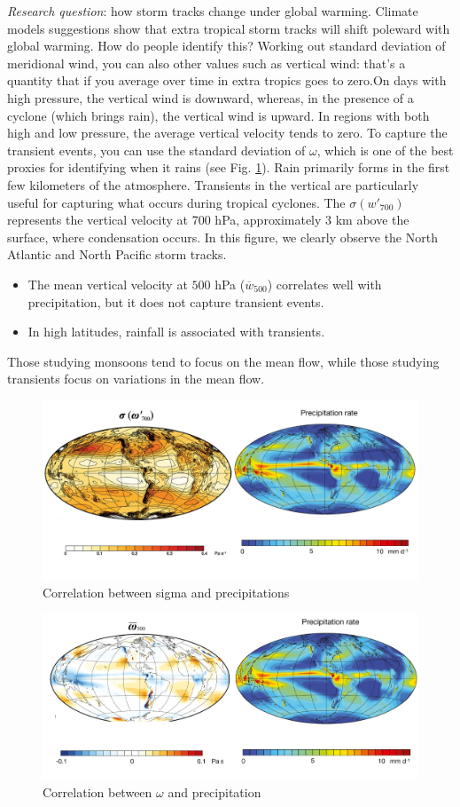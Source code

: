 \textit{Research question}: how storm tracks change under global warming. Climate models suggestions show that extra tropical storm tracks will shift poleward with global warming. How do people identify this? Working out standard deviation of meridional wind, you can also other values such as vertical wind: that's a quantity that if you average over time in extra tropics goes to zero.On days with high pressure, the vertical wind is downward, whereas, in the presence of a cyclone (which brings rain), the vertical wind is upward. In regions with both high and low pressure, the average vertical velocity tends to zero. To capture the transient events, you can use the standard deviation of $\omega$, which is one of the best proxies for identifying when it rains (see Fig. \ref{fig:sigma and precipit}). Rain primarily forms in the first few kilometers of the atmosphere. Transients in the vertical are particularly useful for capturing what occurs during tropical cyclones. The $\sigma(w'_{700})$ represents the vertical velocity at 700 hPa, approximately 3 km above the surface, where condensation occurs. In this figure, we clearly observe the North Atlantic and North Pacific storm tracks.

\begin{itemize}
\item The mean vertical velocity at $500$ hPa ($\overline{w}_{500}$) correlates well with precipitation, but it does not capture transient events.

 \item In high latitudes, rainfall is associated with transients. 
 \end{itemize}

Those studying monsoons tend to focus on the mean flow, while those studying transients focus on variations in the mean flow.

 
\begin{figure}[htpb]
    \centering
    \includegraphics[width=0.5\linewidth]{uploads/sigma and precipitation.png}
    \caption{Correlation between sigma and precipitations}
    \label{fig:sigma and precipit}
\end{figure}
\begin{figure}[htpb]
    \centering
    \includegraphics[width=0.5\linewidth]{uploads/omega and precipit.png}
    \caption{Correlation between $\omega$ and precipitation}
    \label{fig:omega and precipit}
\end{figure}



